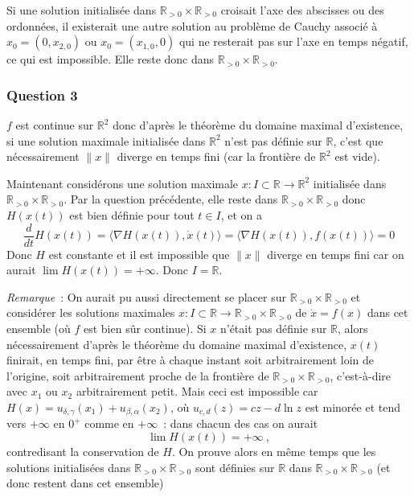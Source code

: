 Si une solution initialisée dans
\(\mathbb{R}_{>0}\times\mathbb{R}_{>0}\) croisait l'axe des abscisses ou
des ordonnées, il existerait une autre solution au problème de Cauchy
associé à \(x_0=(0,x_{2,0})\) ou \(x_0=(x_{1,0},0)\) qui ne resterait
pas sur l'axe en temps négatif, ce qui est impossible. Elle reste donc
dans \(\mathbb{R}_{>0}\times\mathbb{R}_{>0}\).

\hypertarget{answer-cycle-lim-volterra-3}{%
\subsubsection*{Question 3}\label{answer-cycle-lim-volterra-3}}


\(f\) est continue sur \(\mathbb{R}^2\) donc d'après le
théorème du domaine maximal d'existence, si une solution maximale
initialisée dans \(\mathbb{R}^2\) n'est pas définie sur
\(\mathbb{R}\), c'est que nécessairement \(\|x\|\) diverge en temps fini
(car la frontière de \(\mathbb{R}^2\) est vide).

Maintenant considérons une solution maximale
\(x:I\subset \mathbb{R} \to \mathbb{R}^2\) initialisée dans
\(\mathbb{R}_{>0}\times\mathbb{R}_{>0}\). Par la question précédente,
elle reste dans \(\mathbb{R}_{>0}\times\mathbb{R}_{>0}\) donc
\(H(x(t))\) est bien définie pour tout \(t\in I\), et on a \[
\frac{d}{dt}H(x(t)) = \langle \nabla H(x(t)) , \dot{x}(t) \rangle =  \langle \nabla H(x(t)) , f(x(t)) \rangle =0
\] Donc \(H\) est constante et il est impossible que \(\|x\|\) diverge
en temps fini car on aurait \(\lim H(x(t)) = +\infty\). Donc
\(I=\mathbb{R}\).

\emph{Remarque}~: On aurait pu aussi directement se placer sur
\(\mathbb{R}_{>0}\times\mathbb{R}_{>0}\) et considérer les solutions
maximales
\(x:I\subset \mathbb{R} \to \mathbb{R}_{>0}\times\mathbb{R}_{>0}\) de
\(\dot{x}=f(x)\) dans cet ensemble (où \(f\) est bien sûr continue). Si
\(x\) n'était pas définie sur \(\mathbb{R}\), alors nécessairement
d'après le théorème du domaine maximal d'existence, \(x(t)\) finirait,
en temps fini, par être à chaque instant soit arbitrairement loin de
l'origine, soit arbitrairement proche de la frontière de
\(\mathbb{R}_{>0}\times\mathbb{R}_{>0}\), c'est-à-dire avec \(x_1\) ou
\(x_2\) arbitrairement petit. Mais ceci est impossible car
\(H(x) = u_{\delta,\gamma}(x_1) + u_{\beta,\alpha}(x_2)\), où
\(u_{c,d}(z) = cz - d\ln z\) est minorée et tend vers \(+\infty\) en
\(0^+\) comme en \(+\infty\)~: dans chacun des cas on aurait \[
\lim H(x(t)) = +\infty \ ,
\] contredisant la conservation de \(H\). On prouve alors en même temps que les solutions initialisées dans
\(\mathbb{R}_{>0}\times\mathbb{R}_{>0}\) sont définies sur
\(\mathbb{R}\) dans \(\mathbb{R}_{>0}\times\mathbb{R}_{>0}\) (et donc
restent dans cet ensemble)

